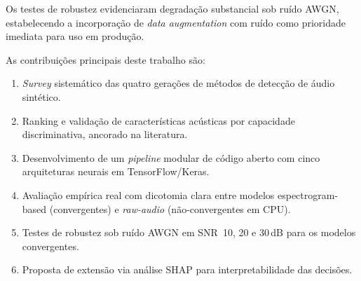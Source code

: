\documentclass[12pt,a4paper]{article}
\begin{document}
Os testes de robustez evidenciaram degrada\c{c}\~{a}o substancial sob
ru\'{i}do AWGN, estabelecendo a incorpora\c{c}\~{a}o de \textit{data
augmentation} com ru\'{i}do como prioridade imediata para uso em produ\c{c}\~{a}o.

As contribui\c{c}\~{o}es principais deste trabalho s\~{a}o:

\begin{enumerate}
    \item \textit{Survey} sistem\'{a}tico das quatro gera\c{c}\~{o}es de
    m\'{e}todos de detec\c{c}\~{a}o de \'{a}udio sint\'{e}tico.
    \item Ranking e valida\c{c}\~{a}o de caracter\'{i}sticas ac\'{u}sticas
    por capacidade discriminativa, ancorado na literatura.
    \item Desenvolvimento de um \textit{pipeline} modular de c\'{o}digo aberto
    com cinco arquiteturas neurais em TensorFlow/Keras.
    \item Avalia\c{c}\~{a}o emp\'{i}rica real com dicotomia clara entre
    modelos espectrogram-based (convergentes) e \textit{raw-audio}
    (n\~{a}o-convergentes em CPU).
    \item Testes de robustez sob ru\'{i}do AWGN em SNR~10, 20 e 30\,dB para
    os modelos convergentes.
    \item Proposta de extens\~{a}o via an\'{a}lise SHAP para
    interpretabilidade das decis\~{o}es.
\end{enumerate}
\end{document}

